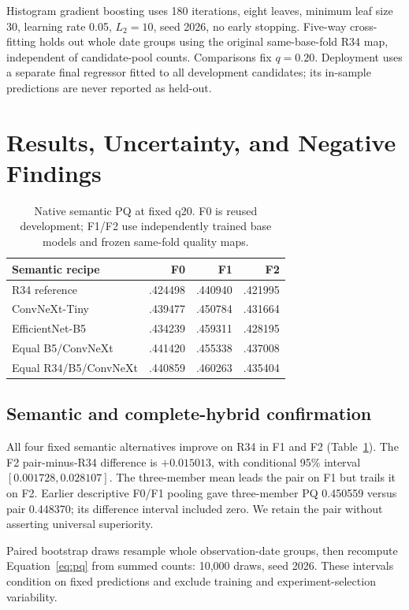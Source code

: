\documentclass[sigconf]{acmart}
\begin{document}
Histogram gradient boosting uses 180 iterations, eight leaves, minimum leaf size 30, learning rate 0.05, $L_2=10$, seed 2026, no early stopping. Five-way cross-fitting holds out whole date groups using the original same-base-fold R34 map, independent of candidate-pool counts. Comparisons fix $q=0.20$. Deployment uses a separate final regressor fitted to all development candidates; its in-sample predictions are never reported as held-out.

\clearpage
\section{Results, Uncertainty, and Negative Findings}
\begin{table}[t]
\caption{Native semantic PQ at fixed q20. F0 is reused development; F1/F2 use independently trained base models and frozen same-fold quality maps.}
\label{tab:semantic}
\small
\begin{tabularx}{\columnwidth}{@{}Xrrr@{}}
\toprule
Semantic recipe & F0 & F1 & F2\\
\midrule
R34 reference & .424498 & .440940 & .421995\\
ConvNeXt-Tiny & .439477 & .450784 & .431664\\
EfficientNet-B5 & .434239 & .459311 & .428195\\
Equal B5/ConvNeXt & .441420 & .455338 & .437008\\
Equal R34/B5/ConvNeXt & .440859 & .460263 & .435404\\
\bottomrule
\end{tabularx}
\end{table}

\subsection{Semantic and complete-hybrid confirmation}
All four fixed semantic alternatives improve on R34 in F1 and F2 (Table~\ref{tab:semantic}). The F2 pair-minus-R34 difference is $+0.015013$, with conditional 95\% interval $[0.001728,0.028107]$. The three-member mean leads the pair on F1 but trails it on F2. Earlier descriptive F0/F1 pooling gave three-member PQ 0.450559 versus pair 0.448370; its difference interval included zero. We retain the pair without asserting universal superiority.

Paired bootstrap draws resample whole observation-date groups, then recompute Equation~\ref{eq:pq} from summed counts: 10,000 draws, seed 2026. These intervals condition on fixed predictions and exclude training and experiment-selection variability.
\end{document}
